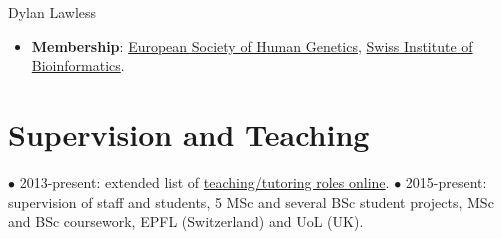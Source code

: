 \documentclass[11pt,a4paper]{article}
\begin{document}
\begin{cv}{Dylan Lawless}
\begin{itemize}[leftmargin=*]
\item \textbf{Membership}: \href{https://www.eshg.org}{European Society of Human Genetics},
\href{https://www.sib.swiss}{Swiss Institute of Bioinformatics}.
\end{itemize}

\section*{Supervision and Teaching}
$\bullet$ 2013-present: extended list of \href{https://lawlessgenomics.com/resume/}{teaching/tutoring roles online}. $\bullet$ 2015-present: supervision of staff and students, 5 MSc and several BSc student projects, MSc and BSc coursework, EPFL (Switzerland) and UoL (UK).


\end{cv}
\end{document}
